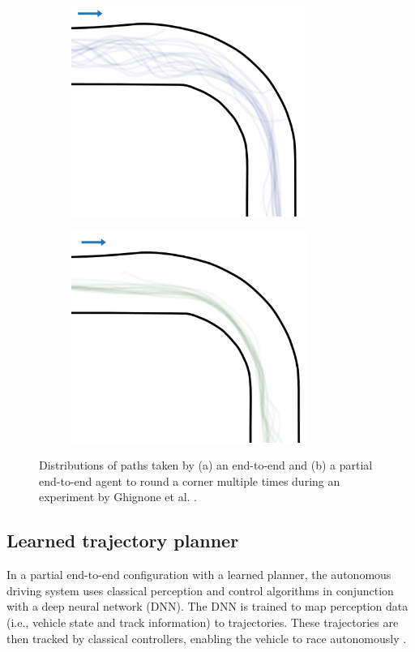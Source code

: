 \begin{figure}[htb!]
    \centering
    \begin{subfigure}[htb!]{0.49\textwidth}
        \centering
        \includegraphics[height=.45\linewidth]{contents/chapt2/figs/TC_end_to_end.png}
        \caption[]{}
        \label{fig:TC_end_to_end}
    \end{subfigure}
    \hfill
    \begin{subfigure}[htb!]{0.49\textwidth}
        \centering
        \includegraphics[height=.45\linewidth]{contents/chapt2/figs/TC_partial.png}
        \caption[]{}
        \label{fig:TC_partial}
    \end{subfigure}
    \hfill
    \caption[Distributions of paths taken by end-to-end and partial end-to-end agents]{Distributions of paths taken by (a) an end-to-end and (b) a partial end-to-end agent to round a corner multiple times during an experiment by Ghignone et al. \cite{Ghignone2022}.}
\label{fig:TC}
\end{figure}

\subsection{Learned trajectory planner}
\label{sec:learned_planner}

In a partial end-to-end configuration with a learned planner, the autonomous driving system uses classical perception and control algorithms in conjunction with a deep neural network (DNN). 
The DNN is trained to map perception data (i.e., vehicle state and track information) to trajectories. 
These trajectories are then tracked by classical controllers, enabling the vehicle to race autonomously \cite{Betz2021}.

